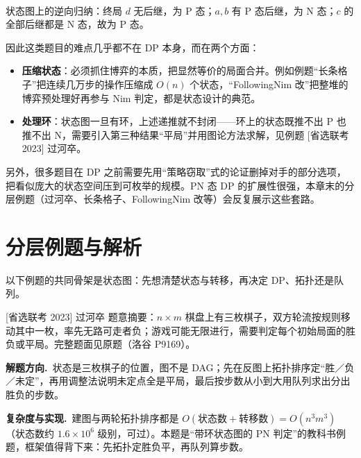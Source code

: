 \documentclass[UTF8,a4paper,11pt,oneside,openany,fontset=fandol]{ctexbook}
\theoremstyle{definition}
\newcommand{\hint}{\par\noindent\textbf{解题方向.}\ }
\newcommand{\cost}{\par\noindent\textbf{复杂度与实现.}\ }
\begin{document}
\begin{center}
\\[2pt]
{\small 状态图上的逆向归纳：终局 $d$ 无后继，为 P 态；$a,b$ 有 P 态后继，为 N 态；$c$ 的全部后继都是 N 态，故为 P 态。}
\end{center}

因此这类题目的难点几乎都不在 DP 本身，而在两个方面：
\begin{itemize}
\item \textbf{压缩状态}：必须抓住博弈的本质，把显然等价的局面合并。例如例题“长条格子”把连续几万步的操作压缩成 $O(n)$ 个状态，“FollowingNim 改”把整堆的博弈预处理好再参与 Nim 判定，都是状态设计的典范。
\item \textbf{处理环}：状态图一旦有环，上述递推就不封闭——环上的状态既推不出 P 也推不出 N，需要引入第三种结果“平局”并用图论方法求解，见例题 [省选联考 2023] 过河卒。
\end{itemize}

另外，很多题目在 DP 之前需要先用“策略窃取”式的论证删掉对手的部分选项，把看似庞大的状态空间压到可枚举的规模。PN 态 DP 的扩展性很强，本章末的分层例题（过河卒、长条格子、FollowingNim 改等）会反复展示这些套路。

\section{分层例题与解析}

以下例题的共同骨架是状态图：先想清楚状态与转移，再决定 DP、拓扑还是队列。

\begin{problem}{[省选联考 2023] 过河卒}
题意摘要：$n\times m$ 棋盘上有三枚棋子，双方轮流按规则移动其中一枚，率先无路可走者负；游戏可能无限进行，需要判定每个初始局面的胜负或平局。完整题面见原题（洛谷 P9169）。
\end{problem}

\hint 状态是三枚棋子的位置，图不是 DAG；先在反图上拓扑排序定“胜／负／未定”，再用调整法说明未定点全是平局，最后按步数从小到大用队列求出分出胜负的步数。

\cost 建图与两轮拓扑排序都是 $O(\text{状态数}+\text{转移数})=O(n^3m^3)$（状态数约 $1.6\times10^{6}$ 级别，可过）。本题是“带环状态图的 PN 判定”的教科书例题，框架值得背下来：先拓扑定胜负平，再队列算步数。
\end{document}
